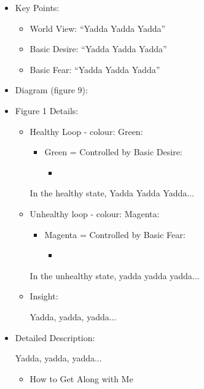 \documentclass[openleft,oneside,showtrims]{memoir}
\begin{document}
\begin{itemize}
\item Key Points:
\label{sec:orgde54a83}
\begin{itemize}
\item World View: ``Yadda Yadda Yadda''
\item Basic Desire: ``Yadda Yadda Yadda''
\item Basic Fear: ``Yadda Yadda Yadda''
\end{itemize}

\item Diagram (figure 9):
\label{sec:orga7aa542}

\item Figure 1 Details:
\label{sec:orged925aa}

\begin{itemize}
\item Healthy Loop - colour: Green:
\label{sec:orga7c45f9}

\begin{itemize}
\item Green = Controlled by Basic Desire:
\begin{itemize}
\item 
\end{itemize}
\end{itemize}

In the healthy state, Yadda Yadda Yadda...

\item Unhealthy loop - colour: Magenta:
\label{sec:org3b0debe}

\begin{itemize}
\item Magenta = Controlled by Basic Fear:

\begin{itemize}
\item 
\end{itemize}
\end{itemize}

In the unhealthy state, yadda yadda yadda...

\item Insight:
\label{sec:org90e59ae}

Yadda, yadda, yadda...
\end{itemize}

\item Detailed Description:
\label{sec:orgb81b4b9}

Yadda, yadda, yadda...

\begin{itemize}
\item How to Get Along with Me
\label{sec:org2ed19b4}


\end{itemize}
\end{itemize}
\end{document}
